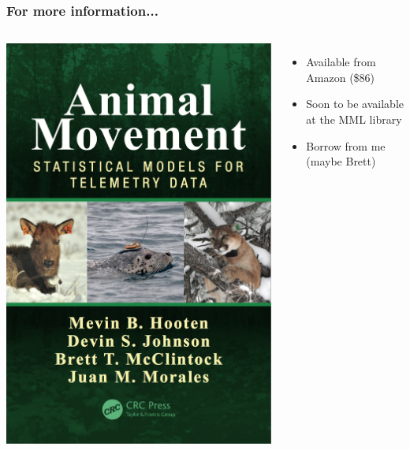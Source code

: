 \documentclass[36pt,handout]{beamer}
\begin{document}
\begin{frame}
\frametitle{For more information...}
\begin{columns}

\begin{center}
\includegraphics[height=0.75\textheight]{Book_Cover_Final.png}
\end{center}

\begin{itemize}
	\item Available from Amazon (\$86)
	\item Soon to be available at the MML library
	\item Borrow from me (maybe Brett)
\end{itemize}

\end{columns}
\end{frame}
\end{document}
